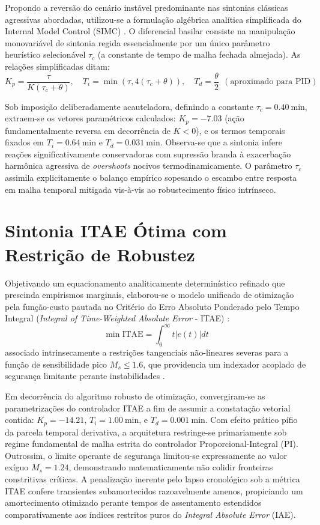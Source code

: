 Propondo a reversão do cenário instável predominante nas sintonias clássicas agressivas abordadas, utilizou-se a formulação algébrica analítica simplificada do Internal Model Control (SIMC) \cite{Skogestad2003}. O diferencial basilar consiste na manipulação monovariável de sintonia regida essencialmente por um único parâmetro heurístico selecionável $\tau_c$ (a constante de tempo de malha fechada almejada).
As relações simplificadas ditam:
\begin{equation}
    K_p = \frac{\tau}{K(\tau_c + \theta)}, \quad T_i = \min(\tau, 4(\tau_c + \theta)), \quad T_d = \frac{\theta}{2} \ \ (\text{aproximado para PID})
\end{equation}

Sob imposição deliberadamente acauteladora, definindo a constante $\tau_c = \SI{0.40}{\minute}$, extraem-se os vetores paramétricos calculados: $K_p = -7.03$ (ação fundamentalmente reversa em decorrência de $K < 0$), e os termos temporais fixados em $T_i = \SI{0.64}{\minute}$ e $T_d = \SI{0.031}{\minute}$. Observa-se que a sintonia infere reações significativamente conservadoras com supressão branda à exacerbação harmônica agressiva de \textit{overshoots} nocivos termodinamicamente. O parâmetro $\tau_c$ assimila explicitamente o balanço empírico sopesando o escambo entre resposta em malha temporal mitigada vis-à-vis ao robustecimento físico intrínseco.

\section{Sintonia ITAE Ótima com Restrição de Robustez}
\label{sec:itae_otimo}

Objetivando um equacionamento analiticamente determinístico refinado que prescinda empirismos marginais, elaborou-se o modelo unificado de otimização pela função-custo pautada no Critério do Erro Absoluto Ponderado pelo Tempo Integral (\textit{Integral of Time-Weighted Absolute Error} - ITAE) \cite{Marlin2000}:
\begin{equation}
    \min \text{ITAE} = \int_{0}^{\infty} t |e(t)| dt
\end{equation}
associado intrinsecamente a restrições tangenciais não-lineares severas para a função de sensibilidade pico $M_s \le 1.6$, que providencia um indexador acoplado de segurança limitante perante instabilidades \cite{Astrom2006}.

Em decorrência do algoritmo robusto de otimização, convergiram-se as parametrizações do controlador ITAE a fim de assumir a constatação vetorial contida: $K_p = -14.21$, $T_i = \SI{1.00}{\minute}$, e $T_d = \SI{0.001}{\minute}$. Com efeito prático pífio da parcela temporal derivativa, a arquitetura restringe-se primariamente sob regime fundamental de malha estrita do controlador Proporcional-Integral (PI). Outrossim, o limite operante de segurança limitou-se expressamente ao valor exíguo $M_s = 1.24$, demonstrando matematicamente não colidir fronteiras constritivas críticas. A penalização inerente pelo lapso cronológico sob a métrica ITAE confere transientes subamortecidos razoavelmente amenos, propiciando um amortecimento otimizado perante tempos de assentamento estendidos comparativamente aos índices restritos puros do \textit{Integral Absolute Error} (IAE).

